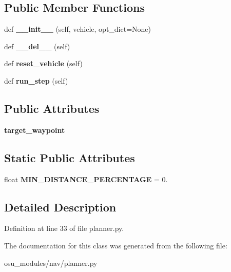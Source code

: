 \subsection*{Public Member Functions}
\begin{DoxyCompactItemize}
\item 
\mbox{\label{classscripts_1_1osu__modules_1_1nav_1_1planner_1_1Plan_a98ef1a8af467d27fa5ac555414b3f961}} 
def {\bfseries \+\_\+\+\_\+init\+\_\+\+\_\+} (self, vehicle, opt\+\_\+dict=None)
\item 
\mbox{\label{classscripts_1_1osu__modules_1_1nav_1_1planner_1_1Plan_a1229b0e3facf6fa7274601a2c6e9b440}} 
def {\bfseries \+\_\+\+\_\+del\+\_\+\+\_\+} (self)
\item 
\mbox{\label{classscripts_1_1osu__modules_1_1nav_1_1planner_1_1Plan_a0d2da97d0fde99d4b90f6855ce63e190}} 
def {\bfseries reset\+\_\+vehicle} (self)
\item 
\mbox{\label{classscripts_1_1osu__modules_1_1nav_1_1planner_1_1Plan_ab859bb0f6092f22445c590348aed1ed1}} 
def {\bfseries run\+\_\+step} (self)
\end{DoxyCompactItemize}
\subsection*{Public Attributes}
\begin{DoxyCompactItemize}
\item 
\mbox{\label{classscripts_1_1osu__modules_1_1nav_1_1planner_1_1Plan_ab5913973da24fee91d9185ee0f3daa64}} 
{\bfseries target\+\_\+waypoint}
\end{DoxyCompactItemize}
\subsection*{Static Public Attributes}
\begin{DoxyCompactItemize}
\item 
\mbox{\label{classscripts_1_1osu__modules_1_1nav_1_1planner_1_1Plan_abeb9968d1ab556df6754f0c459af556a}} 
float {\bfseries M\+I\+N\+\_\+\+D\+I\+S\+T\+A\+N\+C\+E\+\_\+\+P\+E\+R\+C\+E\+N\+T\+A\+GE} = 0.
\end{DoxyCompactItemize}


\subsection{Detailed Description}


Definition at line 33 of file planner.\+py.



The documentation for this class was generated from the following file\+:\begin{DoxyCompactItemize}
\item 
osu\+\_\+modules/nav/planner.\+py\end{DoxyCompactItemize}

